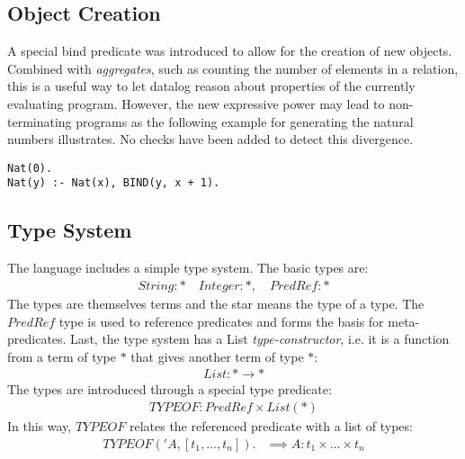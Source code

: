 \vspace*{-\baselineskip}
\subsection{Object Creation}
A special bind predicate was introduced to allow for the creation of new objects. Combined with \textit{aggregates}, such as counting the number of elements in a relation, this is a useful way to let datalog reason about properties of the currently evaluating program. However, the new expressive power may lead to non-terminating programs as the following example for generating the natural numbers illustrates. No checks have been added to detect this divergence.

\begin{verbatim}
Nat(0).
Nat(y) :- Nat(x), BIND(y, x + 1).
\end{verbatim}
\noindent

\subsection{Type System}
The language includes a simple type system. The basic types are:
\begin{align*}
	String : * \quad Integer : *, \quad PredRef : * 
\end{align*}
\noindent
The types are themselves terms and the star means the type of a type. The $PredRef$ type is used to reference predicates and forms the basis for meta-predicates. Last, the type system has a List \textit{type-constructor}, i.e. it is a function from a term of type $*$ that gives another term of type $*$:
\begin{align*}
	List : * \rightarrow *
\end{align*}
\noindent
The types are introduced through a special type predicate:
\begin{align*}
	TYPEOF : PredRef \times List(*)
\end{align*}
In this way, $TYPEOF$ relates the referenced predicate with a list of types:
\begin{align*}
TYPEOF('A, [t_1, \ldots, t_n]). &\implies A : t_1 \times \ldots \times t_n\\
\end{align*}
\vspace*{-\baselineskip}\vspace*{-\baselineskip}\vspace*{-\baselineskip}
